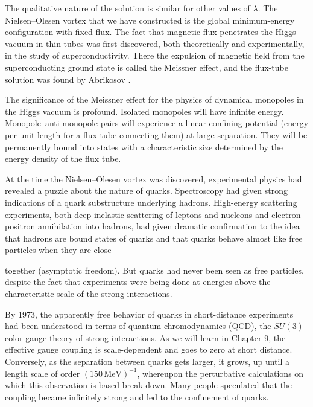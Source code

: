 
The qualitative nature of the solution is similar for other values of $\lambda$.
The Nielsen--Olesen vortex \cite{banks-ref-84} that we have constructed is the global
minimum-energy configuration with fixed flux. The fact that magnetic flux
penetrates the Higgs vacuum in thin tubes was first discovered, both
theoretically and experimentally, in the study of superconductivity. There the
expulsion of magnetic field from the superconducting ground state is called the
Meissner effect, and the flux-tube solution was found by Abrikosov \cite{banks-ref-85}.

The significance of the Meissner effect for the physics of dynamical monopoles
in the Higgs vacuum is profound. Isolated monopoles will have infinite energy.
Monopole--anti-monopole pairs will experience a linear confining potential
(energy per unit length for a flux tube connecting them) at large separation.
They will be permanently bound into states with a characteristic size determined
by the energy density of the flux tube.

At the time the Nielsen--Olesen vortex was discovered, experimental physics had
revealed a puzzle about the nature of quarks. Spectroscopy had given strong
indications of a quark substructure underlying hadrons. High-energy scattering
experiments, both deep inelastic scattering of leptons and nucleons and
electron--positron annihilation into hadrons, had given dramatic confirmation to
the idea that hadrons are bound states of quarks and that quarks behave almost
like free particles when they are close

together (asymptotic freedom). But quarks had never been seen as free particles,
despite the fact that experiments were being done at energies above the
characteristic scale of the strong interactions.

By 1973, the apparently free behavior of quarks in short-distance experiments
had been understood in terms of quantum chromodynamics (QCD), the $SU(3)$ color
gauge theory of strong interactions. As we will learn in Chapter 9, the
effective gauge coupling is scale-dependent and goes to zero at short distance.
Conversely, as the separation between quarks gets larger, it grows, up until a
length scale of order $(150\,\mathrm{MeV})^{-1}$, whereupon the perturbative
calculations on which this observation is based break down. Many people
speculated that the coupling became infinitely strong and led to the
confinement of quarks.

